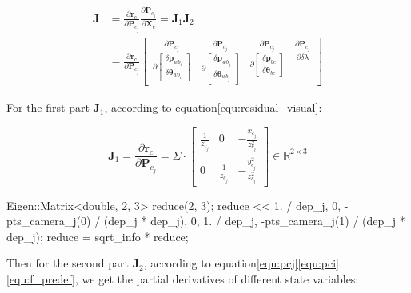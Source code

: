\documentclass[12pt]{report}   %
\begin{document}
\begin{equation}
\begin{aligned}
\mathbf{J} 
&= 
\frac{\partial \mathbf{r}_{c}}{\partial \mathbf{P}_{c_{j}}}
\frac{\partial \mathbf{P}_{c_{j}}}{\partial \mathbf{X}_{c}}
=
\mathbf{J}_1 \mathbf{J}_2 \\
&=
\frac{\partial \mathbf{r}_{c}}{\partial \mathbf{P}_{c_{j}}}
\begin{bmatrix}
\frac{\partial \mathbf{P}_{c_{j}}}
{\partial\left[\begin{array}{c}{\delta \mathbf{p}_{w b_{i}}} \\ 
	{\delta \boldsymbol{\theta}_{w b_{i}}}\end{array}\right]} 
&
\frac{\partial \mathbf{P}_{c_{j}}}
{\partial\left[\begin{array}{c}{\delta \mathbf{p}_{w b_{j}}} \\ 
	{\delta \boldsymbol{\theta}_{w b_{j}}}\end{array}\right]} 
&
\frac{\partial \mathbf{P}_{c_{j}}}
{\partial\left[\begin{array}{c}{\delta \mathbf{p}_{bc}} \\ 
	{\delta \boldsymbol{\theta}_{bc}}\end{array}\right]} 
&
\frac{\partial \mathbf{P}_{c_{j}}}{\partial \delta \lambda}
\end{bmatrix}
\end{aligned}
\end{equation}


For the first part $\mathbf{J}_1$, according to equation\eqref{equ:residual_visual}:

\begin{equation}
\mathbf{J}_1 =
\frac{\partial \mathbf{r}_{c}}{\partial \mathbf{P}_{c_{j}}} = 
\Sigma \cdot
\left[\begin{array}{ccc}
{\frac{1}{z_{c_{j}}}} & {0} & {-\frac{x_{c_{j}}}{z_{c_{j}}^{2}}} \\ 
{0} & {\frac{1}{z_{c_{j}}}} & {-\frac{y_{c_{j}}^{2}}{z_{c_{j}}^{2}}}
\end{array}\right]
\in \mathbb{R}^{2 \times 3}
\end{equation}

\begin{cppcode}
Eigen::Matrix<double, 2, 3> reduce(2, 3);
reduce << 1. / dep_j, 0, -pts_camera_j(0) / (dep_j * dep_j),
0, 1. / dep_j, -pts_camera_j(1) / (dep_j * dep_j);
reduce = sqrt_info * reduce;
\end{cppcode}


Then for the second part $\mathbf{J}_2$, according to equation\eqref{equ:pcj}\eqref{equ:pci}\eqref{equ:f_predef}, we get the partial derivatives of different state variables:
\end{document}
